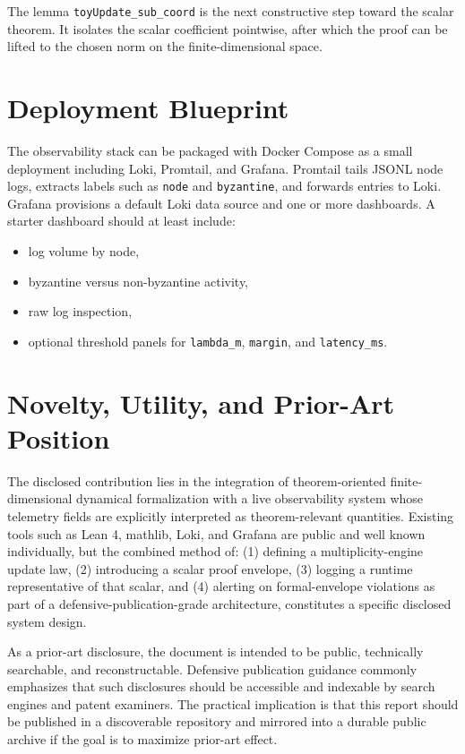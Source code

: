 \documentclass[11pt]{article}
\begin{document}
The lemma \texttt{toyUpdate\_sub\_coord} is the next constructive step toward the scalar theorem. It isolates the scalar coefficient pointwise, after which the proof can be lifted to the chosen norm on the finite-dimensional space.

\section{Deployment Blueprint}
The observability stack can be packaged with Docker Compose as a small deployment including Loki, Promtail, and Grafana. Promtail tails JSONL node logs, extracts labels such as \texttt{node} and \texttt{byzantine}, and forwards entries to Loki. Grafana provisions a default Loki data source and one or more dashboards. A starter dashboard should at least include:
\begin{itemize}
    \item log volume by node,
    \item byzantine versus non-byzantine activity,
    \item raw log inspection,
    \item optional threshold panels for \texttt{lambda\_m}, \texttt{margin}, and \texttt{latency\_ms}.
\end{itemize}

\section{Novelty, Utility, and Prior-Art Position}
The disclosed contribution lies in the integration of theorem-oriented finite-dimensional dynamical formalization with a live observability system whose telemetry fields are explicitly interpreted as theorem-relevant quantities. Existing tools such as Lean 4, mathlib, Loki, and Grafana are public and well known individually, but the combined method of: (1) defining a multiplicity-engine update law, (2) introducing a scalar proof envelope, (3) logging a runtime representative of that scalar, and (4) alerting on formal-envelope violations as part of a defensive-publication-grade architecture, constitutes a specific disclosed system design.

As a prior-art disclosure, the document is intended to be public, technically searchable, and reconstructable. Defensive publication guidance commonly emphasizes that such disclosures should be accessible and indexable by search engines and patent examiners. The practical implication is that this report should be published in a discoverable repository and mirrored into a durable public archive if the goal is to maximize prior-art effect.
\end{document}
